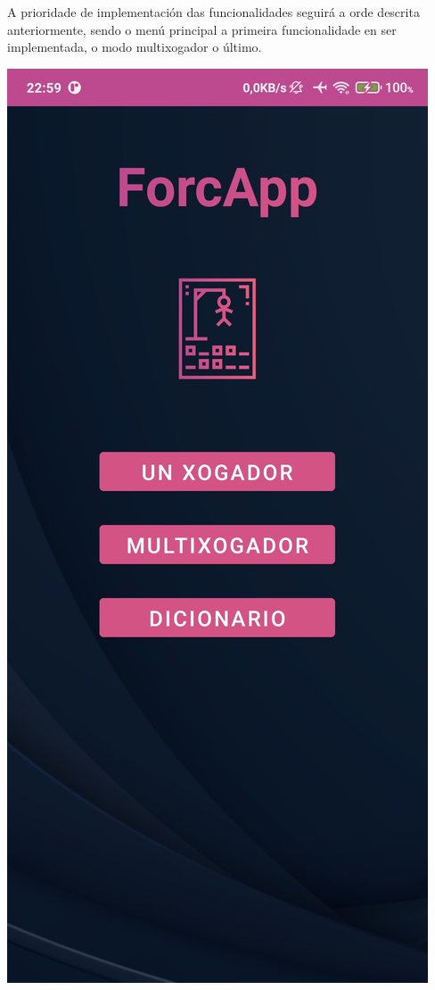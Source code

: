 A prioridade de implementación das funcionalidades seguirá a orde descrita anteriormente, sendo o menú principal a primeira funcionalidade en ser implementada, o modo multixogador o último.\\
\begin{center}
\includegraphics[scale=0.15]{imaxes/menu.jpg}

\end{center}
